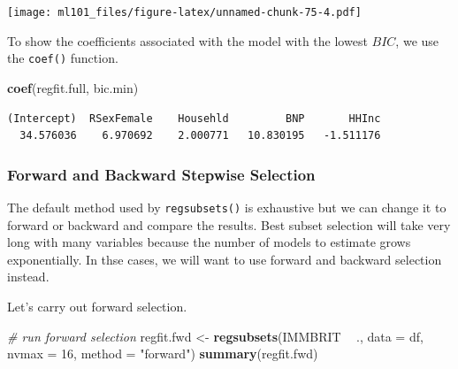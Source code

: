 \documentclass[]{article}
\newenvironment{Shaded}{\begin{snugshade}}{\end{snugshade}}
\newcommand{\CommentTok}[1]{\textcolor[rgb]{0.56,0.35,0.01}{\textit{#1}}}
\newcommand{\DataTypeTok}[1]{\textcolor[rgb]{0.13,0.29,0.53}{#1}}
\newcommand{\DecValTok}[1]{\textcolor[rgb]{0.00,0.00,0.81}{#1}}
\newcommand{\KeywordTok}[1]{\textcolor[rgb]{0.13,0.29,0.53}{\textbf{#1}}}
\newcommand{\NormalTok}[1]{#1}
\newcommand{\OperatorTok}[1]{\textcolor[rgb]{0.81,0.36,0.00}{\textbf{#1}}}
\newcommand{\StringTok}[1]{\textcolor[rgb]{0.31,0.60,0.02}{#1}}
\begin{document}
\texttt{[image: ml101\_files/figure-latex/unnamed-chunk-75-4.pdf]}

To show the coefficients associated with the model with the lowest \(BIC\), we use the \texttt{coef()} function.

\begin{Shaded}
\begin{Highlighting}[]
\KeywordTok{coef}\NormalTok{(regfit.full, bic.min)}
\end{Highlighting}
\end{Shaded}

\begin{verbatim}
(Intercept)  RSexFemale    Househld         BNP       HHInc 
  34.576036    6.970692    2.000771   10.830195   -1.511176 
\end{verbatim}

\hypertarget{forward-and-backward-stepwise-selection}{%
\subsubsection{Forward and Backward Stepwise Selection}\label{forward-and-backward-stepwise-selection}}

The default method used by \texttt{regsubsets()} is exhaustive but we can change it to forward or backward and compare the results. Best subset selection will take very long with many variables because the number of models to estimate grows exponentially. In thse cases, we will want to use forward and backward selection instead.

Let's carry out forward selection.

\begin{Shaded}
\begin{Highlighting}[]
\CommentTok{# run forward selection}
\NormalTok{regfit.fwd <-}\StringTok{ }\KeywordTok{regsubsets}\NormalTok{(IMMBRIT }\OperatorTok{~}\StringTok{ }\NormalTok{., }\DataTypeTok{data =}\NormalTok{ df, }\DataTypeTok{nvmax =} \DecValTok{16}\NormalTok{, }\DataTypeTok{method =} \StringTok{"forward"}\NormalTok{)}
\KeywordTok{summary}\NormalTok{(regfit.fwd)}
\end{Highlighting}
\end{Shaded}
\end{document}
